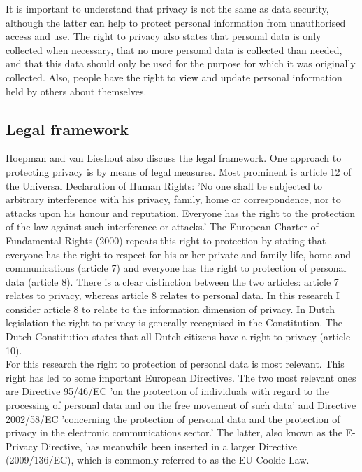 It is important to understand that privacy is not the same as data security, although the latter can help to protect personal information from unauthorised access and use. The right to privacy also states that personal data is only collected when necessary, that no more personal data is collected than needed, and that this data should only be used for the purpose for which it was originally collected. Also, people have the right to view and update personal information held by others about themselves.
	
\subsection{Legal framework}
Hoepman and van Lieshout \cite{privacy} also discuss the legal framework. One approach to protecting privacy is by means of legal measures. Most prominent is article 12 of the Universal Declaration of Human Rights: 'No one shall be subjected to arbitrary interference with his privacy, family, home or correspondence, nor to attacks upon his honour and reputation. Everyone has the right to the protection of the law against such interference or attacks.' The European Charter of Fundamental Rights (2000) repeats this right to protection by stating that everyone has the right to respect for his or her private and family life, home and communications (article 7) and everyone has the right to protection of personal data (article 8). There is a clear distinction between the two articles: article 7 relates to privacy, whereas article 8 relates to personal data. In this research I consider article 8 to relate to the information dimension of privacy. In Dutch legislation the right to privacy is generally recognised in the Constitution. The Dutch Constitution states that all Dutch citizens have a right to privacy (article 10). \\

For this research the right to protection of personal data is most relevant. This right has led to some important European Directives. The two most relevant ones are Directive 95/46/EC \cite{epat1995directive} 'on the protection of individuals with regard to the processing of personal data and on the free movement of such data' and Directive 2002/58/EC \cite{parliamentdirective} 'concerning the protection of personal data and the protection of privacy in the electronic communications sector.' The latter, also known as the E-Privacy Directive, has meanwhile been inserted in a larger Directive (2009/136/EC), which is commonly referred to as the EU Cookie Law.\\

